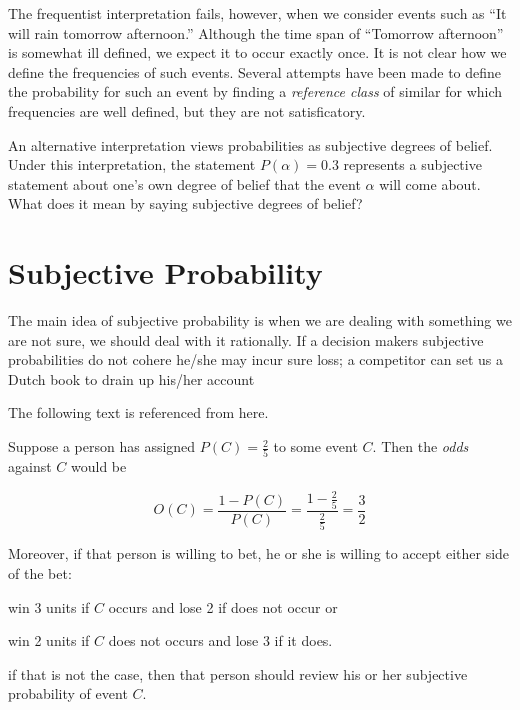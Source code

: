 \documentclass[a4paper]{book}
\begin{document}
  The frequentist interpretation fails, however, when we consider events
  such as ``It will rain tomorrow afternoon.'' Although the time span of
  ``Tomorrow afternoon'' is somewhat ill defined, we expect it to occur
  exactly once. It is not clear how we define the frequencies of such
  events. Several attempts have been made to define the probability for
  such an event by finding a \textit{reference class} of similar for
  which frequencies are well defined, but they are not
  satisficatory.\cite{koller2009probabilistic}

  An alternative interpretation views probabilities as subjective
  degrees of belief. Under this interpretation, the statement $P(\alpha)
  = 0.3$ represents a subjective statement about one's own degree of
  belief that the event $\alpha$ will come
  about.\cite{koller2009probabilistic} What does it mean by saying
  subjective degrees of belief?

\section{Subjective Probability}
  The main idea of subjective probability is when we are dealing with
  something we are not sure, we should deal with it rationally.  If a
  decision makers subjective probabilities do not cohere he/she may
  incur sure loss; a competitor can set us a Dutch book to drain up
  his/her account

  The following text is referenced from here\cite{hogg2012introduction}.

  Suppose a person has assigned $P(C) = \frac{2}{5}$ to some event $C$.
  Then the \textit{odds} against $C$ would be

  \begin{displaymath}
    O(C) = \frac{1 - P(C)}{P(C)} = \frac{1 - \frac{2}{5}}{\frac{2}{5}} =
    \frac{3}{2}
  \end{displaymath}

  Moreover, if that person is willing to bet, he or she is willing to
  accept either side of the bet: 
  \begin{inparaenum}
    \item win 3 units if $C$ occurs and lose 2 if does not occur or 
    \item win 2 units if $C$ does not occurs and lose 3 if it does.
  \end{inparaenum}
  if that is not the case, then that person should review his or her
  subjective probability of event $C$.
\end{document}
